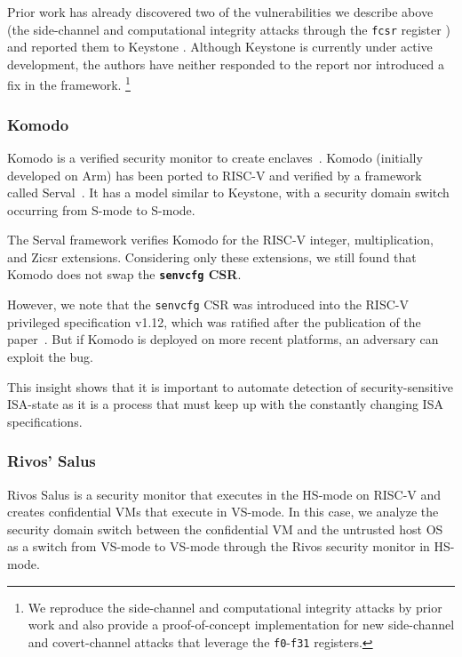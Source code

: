 Prior work has already discovered two of the vulnerabilities we describe above (the side-channel and computational integrity attacks through the \texttt{fcsr} register \cite{dtrap-fpu}) and reported them to Keystone \cite{keystone-fpu-issue}. 
Although Keystone is currently under active development, the authors have neither responded to the report nor introduced a fix in the framework. \footnote{We reproduce the side-channel and computational integrity attacks by prior work \cite{dtrap-fpu} and also provide a proof-of-concept implementation for new side-channel and covert-channel attacks that leverage the \texttt{f0}-\texttt{f31} registers.}


\subsubsection{Komodo} 
Komodo is a verified security monitor to create enclaves~\cite{komodo}. 
Komodo (initially developed on Arm) has been ported to RISC-V and verified by a framework called Serval~\cite{serval}. 
It has a model similar to Keystone, with a security domain switch occurring from S-mode to S-mode. 

The Serval framework verifies Komodo for the RISC-V integer, multiplication, and Zicsr extensions. 
Considering only these extensions, we still found that Komodo does not swap the \textbf{\texttt{senvcfg} CSR}. 

However, we note that the \texttt{senvcfg} CSR was introduced into the RISC-V privileged specification v1.12, which was ratified after the publication of the paper~\cite{serval, riscv-specs}. 
But if Komodo is deployed on more recent platforms, an adversary can exploit the bug.

This insight shows that it is important to automate detection of security-sensitive ISA-state as it is a process that must keep up with the constantly changing ISA specifications. 

\subsubsection{Rivos' Salus}
Rivos Salus is a security monitor that executes in the HS-mode on RISC-V and creates confidential VMs that execute in VS-mode. 
In this case, we analyze the security domain switch between the confidential VM and the untrusted host OS as a switch from VS-mode to VS-mode through the Rivos security monitor in HS-mode. 

